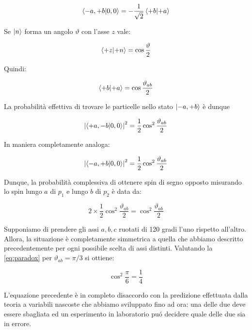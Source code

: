 	\begin{equation}
		\braket{-a, +b}{0, 0} = - \frac{1}{\sqrt{2}} \braket{+b}{+a}
	\end{equation}

Se $\ket{n}$ forma un angolo $\vartheta$ con l'asse $z$ vale:

	\begin{equation}
		\braket{+z}{+n} = \cos \frac{\vartheta}{2}
	\end{equation}

Quindi:

	\begin{equation}
		\braket{+b}{+a} = \cos \frac{\vartheta_{ab}}{2}
	\end{equation}

La probabilit\`a effettiva di trovare le particelle nello stato $\ket{-a, +b}$ \`e dunque

	\begin{equation}
		\left | \braket{+a, -b}{0, 0} \right | ^ 2  = \frac{1}{2} \cos^2 \frac{\vartheta_{ab}}{2}
	\end{equation}

In maniera completamente analoga:

	\begin{equation}
		\left | \braket{-a, +b}{0, 0} \right | ^ 2  = \frac{1}{2} \cos^2 \frac{\vartheta_{ab}}{2}
	\end{equation}

Dunque, la probabilit\`a complessiva di ottenere spin di segno opposto misurando lo spin lungo $a$ di $p_1$ e lungo $b$ di $p_2$ \`e data da:

	\begin{equation} \label{eq:paradox}
		2 \times \frac{1}{2} \cos ^2 \frac{\vartheta_{ab}}{2} = \cos^2 \frac{\vartheta_{ab}}{2}
	\end{equation}

Supponiamo di prendere gli assi $a, b, c$ ruotati di 120 gradi l'uno rispetto all'altro. Allora, la situazione \`e completamente simmetrica a quella che abbiamo descritto precedentemente per ogni possibile scelta di assi distinti. Valutando la \eqref{eq:paradox} per $\vartheta_{ab} = \pi / 3$ si ottiene:

	\begin{equation}
		\cos^2 \frac{\pi}{6} = \frac{1}{4}
	\end{equation}

L'equazione precedente \`e in completo disaccordo con la predizione effettuata dalla teoria a variabili nascoste che abbiamo sviluppato fino ad ora: una delle due deve essere sbagliata ed un esperimento in laboratorio pu\'o decidere quale delle due sia in errore.
